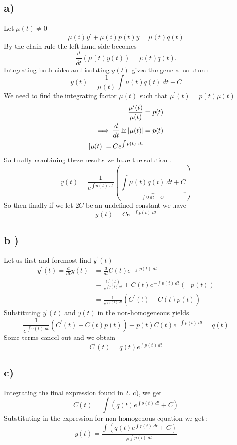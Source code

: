 \documentclass[
	12pt,
	]{article}
\theoremstyle{definition}
\theoremstyle{definition}
\theoremstyle{definition}
\theoremstyle{definition}
\theoremstyle{definition}
\theoremstyle{example}
\theoremstyle{note}
\theoremstyle{remark}
\theoremstyle{example}
\begin{document}
		\subsection{a) }
			Let $\mu(t) \neq 0$
			$$ \mu(t) y^{\prime} + \mu(t) p(t) y = \mu(t) q(t) $$
			By the chain rule the left hand side becomes 
			$$ \frac{d}{dt} (\mu(t) y(t)) = \mu(t)q(t).$$
			Integrating both sides and isolating $y(t)$ gives the general soluton : 
			$$ y(t) = \frac{1}{\mu(t)} \int \mu(t) q(t) \ dt + C$$
			We need to find the integrating factor $\mu(t)$ such that $\mu^{\prime}(t) = p(t)\mu(t)$ 
			\begin{align*}
				\frac{\mu^{\prime}(t)}{\mu(t)} &= p(t) \\
				\implies \frac{d}{dt}\ln\abs{\mu(t)} &= p(t)\\
				\abs{\mu(t)} = Ce^{\int p(t) \ dt}
			\end{align*}
			So finally, combining these results we have the solution : 
			$$ y(t) = \frac{1}{e^{\int p(t) \ dt}}(\underbrace{\int \mu(t)q(t) \ dt +C}_{\int 0 \ dt = C})$$ 
			So then finally if we let $2C$ be an undefined constant we have 
			$$ y(t) = Ce^{-\int p(t) \ dt}$$
		\subsection{b )}
			Let us first and foremost find $y^{\prime}(t)$ 
			\begin{align*}
				y^{\prime}(t) = \frac{d}{dt} y(t) &= \frac{d}{dt} C(t) e^{-\int p(t) \ dt} \\
				&= \frac{C^{\prime}(t)}{e^{\int p(t) \ dt }} + C(t)e^{-\int p(t) \ dt}(-p(t)) \\
				&= \frac{1}{e^{\int p(t) \ dt}} (C^{\prime} (t) - C(t)p(t))
			\end{align*} 
			Substituting $y^{\prime}(t)$ and $y(t)$ in the non-homogeneous yields 
			$$ \frac{1}{e^{\int p(t) \ dt}} (C^{\prime} (t) - C(t)p(t)) + p(t) C(t) e^{-\int p(t) \ dt} = q(t)$$
			Some terms cancel out and we obtain
			$$ C^{\prime}(t) = q(t)e^{\int p(t)\ dt}$$
		\subsection{c) }
			Integrating the final expression found in 2. c), we get
			$$ C(t) = \int \left(q(t) e^{\int p(t) \ dt} + C\right)$$
			Substituting in the expression for non-homogenous equation we get : 
			$$ y(t) = \frac{\int\left(q(t)e^{\int p(t) \ dt} + C\right)}{e^{\int p(t) \ dt}}$$
\end{document}
